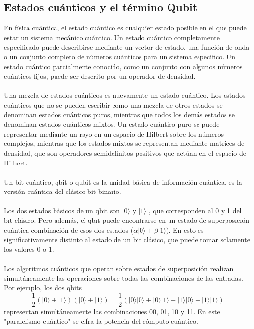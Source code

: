 \subsection{Estados cuánticos y el término Qubit}
En física cuántica, el estado cuántico es cualquier estado posible en el que puede estar un sistema mecánico cuántico. Un estado cuántico completamente especificado puede describirse mediante un vector de estado, una función de onda o un conjunto completo de números cuánticos para un sistema específico. Un estado cuántico parcialmente conocido, como un conjunto con algunos números cuánticos fijos, puede ser descrito por un operador de densidad.\\\\
Una mezcla de estados cuánticos es nuevamente un estado cuántico. Los estados cuánticos que no se pueden escribir como una mezcla de otros estados se denominan estados cuánticos puros, mientras que todos los demás estados se denominan estados cuánticos mixtos. Un estado cuántico puro se puede representar mediante un rayo en un espacio de Hilbert sobre los números complejos, mientras que los estados mixtos se representan mediante matrices de densidad, que son operadores semidefinitos positivos que actúan en el espacio de Hilbert.\\\\
Un bit cuántico, qbit o qubit es la unidad básica de información cuántica, es la versión cuántica del clásico bit binario.\\\\
Los dos estados básicos de un qbit son  $|0\rangle$  y  $|1\rangle$ , que corresponden al 0 y 1 del bit clásico. Pero además, el qbit puede encontrarse en un estado de superposición cuántica combinación de esos dos estados ($\alpha |0\rangle +\beta |1\rangle)$. En esto es significativamente distinto al estado de un bit clásico, que puede tomar solamente los valores 0 o 1.\\\\
 Los algoritmos cuánticos que operan sobre estados de superposición realizan simultáneamente las operaciones sobre todas las combinaciones de las entradas. Por ejemplo, los dos qbits
 \begin{equation*}
   \frac{1}{2}(|0\rangle+|1\rangle)(|0\rangle+|1\rangle)=\frac{1}{2}(|0\rangle|0\rangle+|0\rangle|1\rangle+|1\rangle|0\rangle+|1\rangle|1\rangle)
 \end{equation*}
representan simultáneamente las combinaciones 00, 01, 10 y 11. En este "paralelismo cuántico" se cifra la potencia del cómputo cuántico.\\\\
